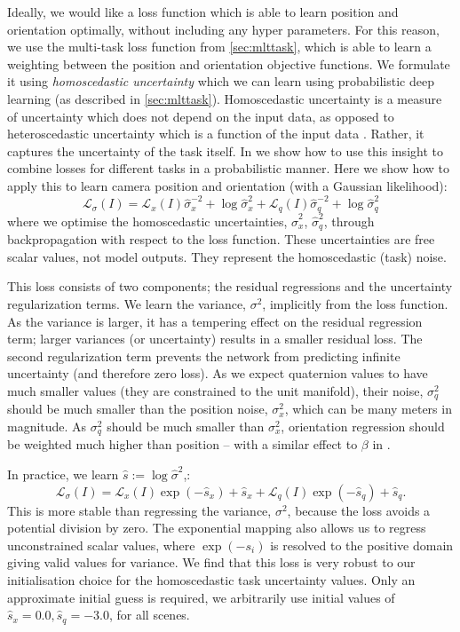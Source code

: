 Ideally, we would like a loss function which is able to learn position and orientation optimally, without including any hyper parameters. For this reason, we use the multi-task loss function from \cref{sec:mlttask}, which is able to learn a weighting between the position and orientation objective functions. We formulate it using \textit{homoscedastic uncertainty} which we can learn using probabilistic deep learning (as described in \cref{sec:mlttask}). Homoscedastic uncertainty is a measure of uncertainty which does not depend on the input data, as opposed to heteroscedastic uncertainty which is a function of the input data \citep{kendall2017uncertainties}. Rather, it captures the uncertainty of the task itself. In \citep{kendall2017multi} we show how to use this insight to combine losses for different tasks in a probabilistic manner. Here we show how to apply this to learn camera position and orientation (with a Gaussian likelihood):
\begin{equation}
\label{eqn:loss4}
\mathcal{L}_{\sigma}(I) = \mathcal{L}_x(I) \hat{\sigma}_x^{-2} + \log{\hat{\sigma}_x^2} + \mathcal{L}_{q}(I) \hat{\sigma}_q^{-2} + \log{\hat{\sigma}_q^2}
\end{equation}
where we optimise the homoscedastic uncertainties, $\hat{\sigma}_x^2$, $\hat{\sigma}_q^2$, through backpropagation with respect to the loss function. These uncertainties are free scalar values, not model outputs. They represent the homoscedastic (task) noise.

This loss consists of two components; the residual regressions and the uncertainty regularization terms. We learn the variance, $\sigma^2$, implicitly from the loss function. As the variance is larger, it has a tempering effect on the residual regression term; larger variances (or uncertainty) results in a smaller residual loss. The second regularization term prevents the network from predicting infinite uncertainty (and therefore zero loss). As we expect quaternion values to have much smaller values (they are constrained to the unit manifold), their noise, $\sigma_q^2$ should be much smaller than the position noise, $\sigma_x^2$, which can be many meters in magnitude. As $\sigma_q^2$ should be much smaller than $\sigma_x^2$, orientation regression should be weighted much higher than position -- with a similar effect to $\beta$ in .

In practice, we learn $\hat{s}:=\log\hat{\sigma}^2$,:
\begin{equation}
\label{eqn:loss5}
\mathcal{L}_{\sigma}(I) = \mathcal{L}_x(I) \exp (-\hat{s}_x) + \hat{s}_x + \mathcal{L}_{q}(I) \exp (-\hat{s}_q) + \hat{s}_q.
\end{equation}
This is more stable than regressing the variance, $\sigma^2$, because the loss avoids a potential division by zero. The exponential mapping also allows us to regress unconstrained scalar values, where $\exp(-s_i)$ is resolved to the positive domain giving valid values for variance. We find that this loss is very robust to our initialisation choice for the homoscedastic task uncertainty values. Only an approximate initial guess is required, we arbitrarily use initial values of $\hat{s}_x=0.0, \hat{s}_q=-3.0$, for all scenes.

